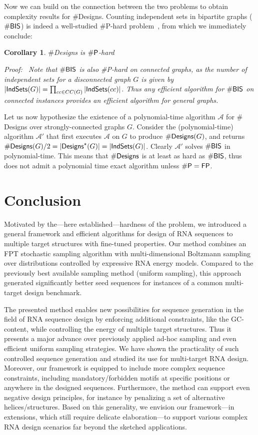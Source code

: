 \documentclass{bioinfo}
\newtheorem{corollary}[theorem]{Corollary}
\renewenvironment{proof}[1][]{\noindent \em Proof\ifthenelse{\equal{#1}{}}{}{ (#1)}:~}{}
\newcommand{\Design}[1]{{\sf Designs}^{\star}(#1)}
\newcommand{\NumDesign}{\ensuremath{\#}{\sf Designs}\xspace}
\newcommand{\IS}[1]{{\sf IndSets}(#1)}
\newcommand{\Nuc}[1]{{\sf #1}}
\newcommand{\Cb}{\Nuc{C}}
\newcommand{\Gb}{\Nuc{G}}
\newcommand{\GCb}{\Gb\Cb}
\begin{document}
Now we can build on the connection between the two problems to obtain complexity results for \NumDesign. Counting independent sets in bipartite graphs ($\#{\sf BIS}$) is indeed a well-studied \#{\sf P}-hard problem~\citep{Ge2012}, from which we immediately conclude:
\begin{corollary}
  \NumDesign is $\#{\sf P}$-hard
\end{corollary}
\begin{proof}
  Note that $\#{\sf BIS}$ is also \#{\sf P}-hard on connected graphs, as the number of independent sets for a disconnected graph $G$ is given by $|\IS{G}|=\prod_{cc\in CC(G)} |\IS{cc}|$. Thus any efficient algorithm for $\#{\sf BIS}$ on connected instances provides an efficient algorithm for general graphs.
  
  Let us now hypothesize the existence of a polynomial-time algorithm $\mathcal{A}$ for \NumDesign over strongly-connected graphs $G$. Consider the (polynomial-time) algorithm $\mathcal{A}'$ that first executes $\mathcal{A}$ on $G$ to produce $\NumDesign(G)$, and returns $\NumDesign(G)/2=|\Design{G}| = |\IS{G}|$. Clearly $\mathcal{A}'$ solves $\#{\sf BIS}$ in polynomial-time. This means that $\NumDesign$  is at least as hard as $\#{\sf BIS}$, thus does not admit a polynomial time exact algorithm unless $\#{\sf P}={\sf FP}$.
\end{proof}

\section{Conclusion}
Motivated by the---here established---hardness of the problem, we
introduced a general framework and efficient algorithms for design of
RNA sequences to multiple target structures with fine-tuned
properties. Our method combines an FPT stochastic sampling algorithm
with multi-dimensional Boltzmann sampling over distributions
controlled by expressive RNA energy models.  Compared to the
previously best available sampling method (uniform sampling), this
approach generated significantly better seed sequences for instances
of a common multi-target design benchmark.

The presented method enables new possibilities for sequence generation
in the field of RNA sequence design by enforcing additional
constraints, like the \GCb-content, while controlling the energy of
multiple target structures. Thus it presents a major advance over
previously applied ad-hoc sampling and even efficient uniform sampling
strategies. We have shown the practicality of such controlled sequence
generation and studied its use for multi-target RNA design. Moreover,
our framework is equipped to include more complex sequence
constraints, including mandatory/forbidden motifs at specific
positions or anywhere in the designed sequences. Furthermore, the
method can support even negative design principles, for instance by
penalizing a set of alternative helices/structures. Based on this
generality, we envision our framework---in extensions, which still
require delicate elaboration---to support various complex RNA design
scenarios far beyond the sketched applications.
\end{document}
